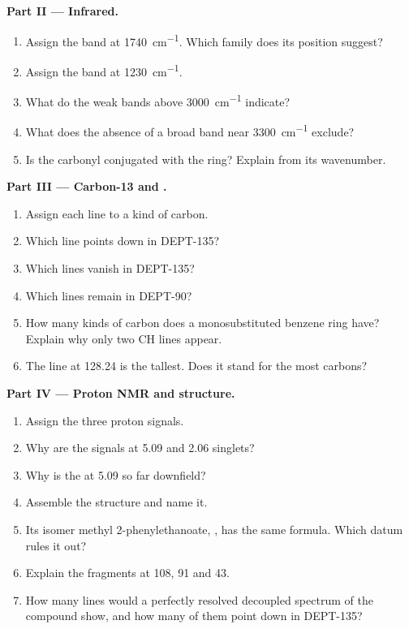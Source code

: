 \begin{problem}
\medskip
\noindent\textbf{Part II --- Infrared.}
\begin{enumerate}[resume]
  \item Assign the band at \qty{1740}{cm^{-1}}. Which family does its position suggest?
  \item Assign the band at \qty{1230}{cm^{-1}}.
  \item What do the weak bands above \qty{3000}{cm^{-1}} indicate?
  \item What does the absence of a broad band near \qty{3300}{cm^{-1}} exclude?
  \item Is the carbonyl conjugated with the ring? Explain from its wavenumber.
\end{enumerate}

\medskip
\noindent\textbf{Part III --- Carbon-13 and .}
\begin{enumerate}[resume]
  \item Assign each line to a kind of carbon.
  \item Which line points down in DEPT-135?
  \item Which lines vanish in DEPT-135?
  \item Which lines remain in DEPT-90?
  \item How many kinds of carbon does a monosubstituted benzene ring have? Explain why only two 
        CH lines appear.
  \item The line at 128.24 is the tallest. Does it stand for the most carbons?
\end{enumerate}

\medskip
\noindent\textbf{Part IV --- Proton NMR and structure.}
\begin{enumerate}[resume]
  \item Assign the three proton signals.
  \item Why are the signals at 5.09 and 2.06 singlets?
  \item Why is the  at 5.09 so far downfield?
  \item Assemble the structure and name it.
  \item Its isomer methyl 2-phenylethanoate, , has the same formula. Which datum rules it
        out?
  \item Explain the fragments at 108, 91 and 43.
  \item How many lines would a perfectly resolved decoupled  spectrum of the compound show, and
        how many of them point down in DEPT-135?
\end{enumerate}
\end{problem}
